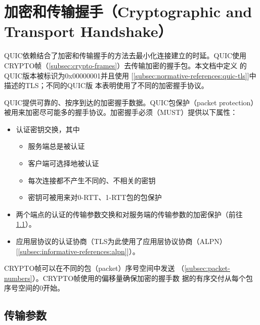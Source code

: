 \section{加密和传输握手（Cryptographic and Transport Handshake）}
QUIC依赖结合了加密和传输握手的方法去最小化连接建立的时延。QUIC使用
CRYPTO帧（\ref{subsec:crypto-frames}）去传输加密的握手包。本文档中定义
的QUIC版本被标识为0x00000001并且使用
[\ref{subsec:normative-references:quic-tls}]中描述的TLS；不同的QUIC版
本表明使用了不同的加密握手协议。

QUIC提供可靠的、按序到达的加密握手数据。QUIC包保护（packet protection）
被用来加密尽可能多的握手协议。加密握手必须（MUST）提供以下属性：
\begin{itemize}
\item 认证密钥交换，其中
  \begin{itemize}
  \item 服务端总是被认证
  \item 客户端可选择地被认证
  \item 每次连接都不产生不同的、不相关的密钥
  \item 密钥可被用来对0-RTT、1-RTT包的包保护
  \end{itemize}
\item 两个端点的认证的传输参数交换和对服务端的传输参数的加密保护（前往
  \ref{subsec:transport-parameters}）。
\item 应用层协议的认证协商（TLS为此使用了应用层协议协商（ALPN）
  [\ref{subsec:informative-references:alpn}]）。
\end{itemize}

CRYPTO帧可以在不同的包（packet）序号空间中发送
（\ref{subsec:packet-numbers}）。CRYPTO帧使用的偏移量确保加密的握手数
据的有序交付从每个包序号空间的0开始。

\subsection{传输参数}
\label{subsec:transport-parameters}
